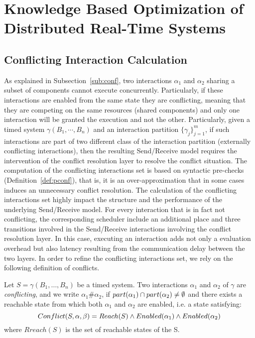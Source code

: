 \chapter{Knowledge Based Optimization of Distributed Real-Time Systems}\label{chap:4}
\minitoc

\section{Conflicting Interaction Calculation}

As explained in Subsection~\ref{sub:conf}, two interactions $\alpha_1$ and $\alpha_2$ 
sharing a subset of components cannot execute concurrently.
Particularly, if these interactions are enabled from the same state they are conflicting, meaning
that they are competing on the same resources (shared components) and only one interaction will
be granted the execution and not the other.
Particularly, given a timed system $\gamma(B_1,\cdots,B_n)$ and an interaction partition
$\{\gamma_j\}_{j=1}^m$, if such interactions are part of two different class of the interaction
partition (externally conflicting interactions), then the resulting Send/Receive model requires 
the intervention of the conflict resolution layer to resolve the conflict situation. 
The computation of the conflicting interactions set is based on syntactic pre-checks
(Definition~\ref{def:pconf}), that is, it is an over-approximation that in some cases  
induces an unnecessary conflict resolution.  
The calculation of the conflicting interactions set highly impact the structure and the 
performance of the underlying Send/Receive model. For every interaction that is in fact
not conflicting, the corresponding scheduler include an additional place and three transitions
involved in the Send/Receive interactions involving the conflict resolution layer.
In this case, executing an interaction adds not only a evaluation overhead but also latency 
resulting from the communication delay between the two layers.
In order to refine the conflicting interactions set, we rely on the following definition
of conflicts.
\begin{definition}
\label{def:conf}
Let $S = \gamma(B_1,\dotsc,B_n)$ be a timed system. Two interactions 
$\alpha_1$ and $\alpha_2$ of $\gamma$ are \emph{conflicting}, and we write $\alpha_1\#\alpha_2$, 
  if $part(\alpha_1) \cap part(\alpha_2) \neq \emptyset$ and there exists a reachable state from 
which both $\alpha_1$ and $\alpha_2$ are enabled, i.e. a state satisfying:
\begin{equation}\label{eq:conf1}
  Conflict(S,\alpha,\beta)=Reach(S) \wedge Enabled(\alpha_1) \wedge Enabled(\alpha_2)
\end{equation}
  where $Rreach(S)$ is the set of reachable states of the S.
\end{definition}

